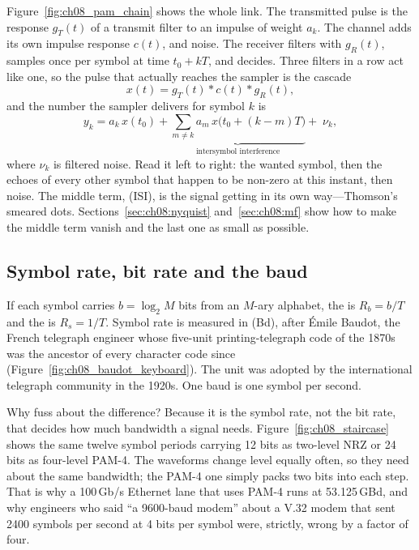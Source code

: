 Figure~\ref{fig:ch08_pam_chain} shows the whole link. The transmitted pulse is the response
$g_T(t)$ of a transmit filter to an impulse of weight $a_k$. The channel adds its own impulse
response $c(t)$, and noise. The receiver filters with $g_R(t)$, samples once per symbol at time
$t_0+kT$, and decides. Three filters in a row act like one, so the pulse that actually reaches
the sampler is the cascade
\begin{equation}
x(t)=g_T(t)*c(t)*g_R(t),
\label{eq:ch08:overall}
\end{equation}
and the number the sampler delivers for symbol $k$ is
\begin{equation}
y_k=a_k\,x(t_0)+\underbrace{\sum_{m\ne k}a_m\,x\big(t_0+(k-m)T\big)}_{\text{intersymbol interference}}+\;\nu_k,
\label{eq:ch08:sample}
\end{equation}
where $\nu_k$ is filtered noise. Read it left to right: the wanted symbol, then the echoes of
every other symbol that happen to be non-zero at this instant, then noise. The middle term,
 (ISI), is the signal getting in its own way---Thomson's
smeared dots. Sections~\ref{sec:ch08:nyquist} and~\ref{sec:ch08:mf} show how to make the
middle term vanish and the last one as small as possible.

\subsection{Symbol rate, bit rate and the baud}

If each symbol carries $b=\log_2 M$ bits from an $M$-ary alphabet, the  is
$R_b=b/T$ and the  is $R_s=1/T$. Symbol rate is measured in 
(Bd), after \'Emile Baudot, the French telegraph engineer whose five-unit printing-telegraph
code of the 1870s was the ancestor of every character code since
(Figure~\ref{fig:ch08_baudot_keyboard}). The unit was adopted by the international telegraph
community in the 1920s. One baud is one symbol per second.


Why fuss about the difference? Because it is the symbol rate, not the bit rate, that decides
how much bandwidth a signal needs. Figure~\ref{fig:ch08_staircase} shows the same twelve
symbol periods carrying 12 bits as two-level NRZ or 24 bits as four-level PAM-4. The waveforms
change level equally often, so they need about the same bandwidth; the PAM-4 one simply
packs two bits into each step. That is why a 100\,Gb/s Ethernet lane that uses PAM-4 runs at
53.125\,GBd, and why engineers who said ``a 9600-baud modem'' about a V.32 modem that sent
2400 symbols per second at 4 bits per symbol were, strictly, wrong by a factor of four.

